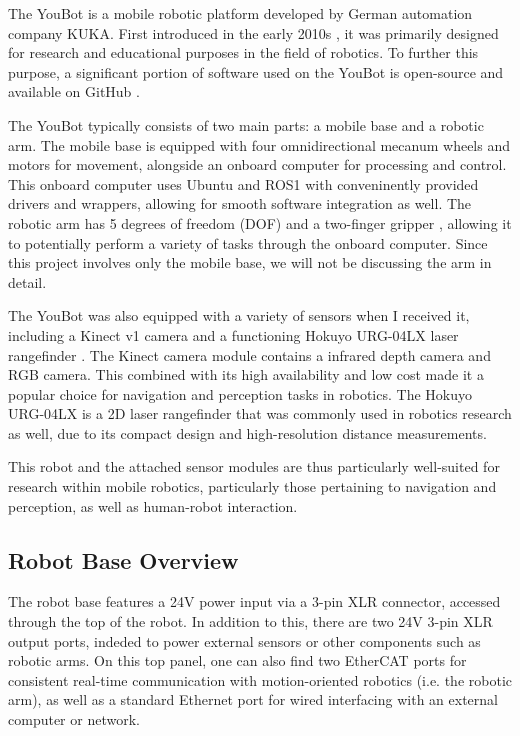\documentclass[a4paper, 12pt]{article}
\newif\ifshownotes
\newcommand{\notes}[1]{\ifshownotes\textcolor{blue}{#1}\fi}
\begin{document}
    The YouBot is a mobile robotic platform developed by German automation company KUKA. First introduced in the early 2010s \notes{[cite]}, it was primarily designed for research and educational purposes in the field of robotics. To further this purpose, a significant portion of software used on the YouBot is open-source and available on GitHub \notes{[cite]}. 

    The YouBot typically consists of two main parts: a mobile base and a robotic arm. The mobile base is equipped with four omnidirectional mecanum wheels and motors for movement, alongside an onboard computer for processing and control. This onboard computer uses Ubuntu and ROS1 with conveninently provided drivers and wrappers, allowing for smooth software integration as well. The robotic arm has 5 degrees of freedom (DOF) and a two-finger gripper \notes{[cite]}, allowing it to potentially perform a variety of tasks through the onboard computer. Since this  project involves only the mobile base, we will not be discussing the arm in detail.

    The YouBot was also equipped with a variety of sensors when I received it, including a Kinect v1 camera \notes{[cite]} and a functioning Hokuyo URG-04LX laser rangefinder \notes{[cite]}. The Kinect camera module contains a infrared depth camera and RGB camera. This combined with its high availability and low cost made it a popular choice for navigation and perception tasks in robotics. The Hokuyo URG-04LX is a 2D laser rangefinder that was commonly used in robotics research as well, due to its compact design and high-resolution distance measurements. 

    This robot and the attached sensor modules are thus particularly well-suited for research within mobile robotics, particularly those pertaining to navigation and perception, as well as human-robot interaction. 

    \subsection{Robot Base Overview}

    \notes{initial inspection\\}


    The robot base features a 24V power input via a 3-pin XLR connector, accessed through the top of the robot. In addition to this, there are two 24V 3-pin XLR output ports, indeded to power external sensors or other components such as robotic arms. On this top panel, one can also find two EtherCAT ports for consistent real-time communication with motion-oriented robotics (i.e. the robotic arm), as well as a standard Ethernet port for wired interfacing with an external computer or network. 
\end{document}
